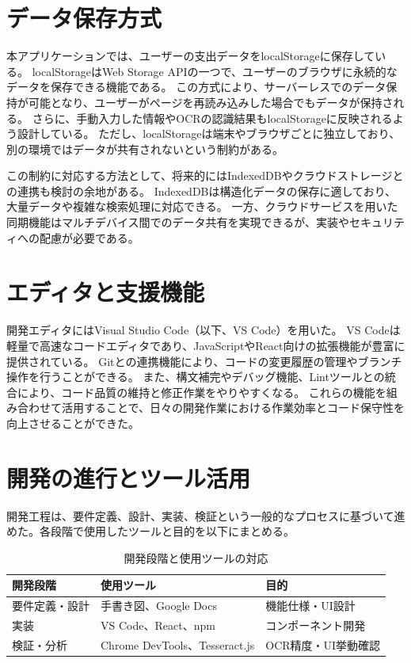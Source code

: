 \documentclass[main]{subfiles}
\begin{document}
\section{データ保存方式}

本アプリケーションでは、ユーザーの支出データをlocalStorageに保存している。
localStorageはWeb Storage APIの一つで、ユーザーのブラウザに永続的なデータを保存できる機能である。
この方式により、サーバーレスでのデータ保持が可能となり、ユーザーがページを再読み込みした場合でもデータが保持される。
さらに、手動入力した情報やOCRの認識結果もlocalStorageに反映されるよう設計している。
ただし、localStorageは端末やブラウザごとに独立しており、別の環境ではデータが共有されないという制約がある。

この制約に対応する方法として、将来的にはIndexedDBやクラウドストレージとの連携も検討の余地がある。
IndexedDBは構造化データの保存に適しており、大量データや複雑な検索処理に対応できる。
一方、クラウドサービスを用いた同期機能はマルチデバイス間でのデータ共有を実現できるが、実装やセキュリティへの配慮が必要である。

\section{エディタと支援機能}

開発エディタにはVisual Studio Code（以下、VS Code）を用いた。
VS Codeは軽量で高速なコードエディタであり、JavaScriptやReact向けの拡張機能が豊富に提供されている。
Gitとの連携機能により、コードの変更履歴の管理やブランチ操作を行うことができる。
また、構文補完やデバッグ機能、Lintツールとの統合により、コード品質の維持と修正作業をやりやすくなる。
これらの機能を組み合わせて活用することで、日々の開発作業における作業効率とコード保守性を向上させることができた。

\section{開発の進行とツール活用}

開発工程は、要件定義、設計、実装、検証という一般的なプロセスに基づいて進めた。各段階で使用したツールと目的を以下にまとめる。

\begin{table}[htbp]
\centering
\caption{開発段階と使用ツールの対応}
\label{tab:dev_phases}
\begin{tabular}{lll}
\hline
開発段階 & 使用ツール & 目的 \\
\hline
要件定義・設計 & 手書き図、Google Docs & 機能仕様・UI設計 \\
実装 & VS Code、React、npm & コンポーネント開発 \\
検証・分析 & Chrome DevTools、Tesseract.js & OCR精度・UI挙動確認 \\
\hline
\end{tabular}
\end{table}
\end{document}

